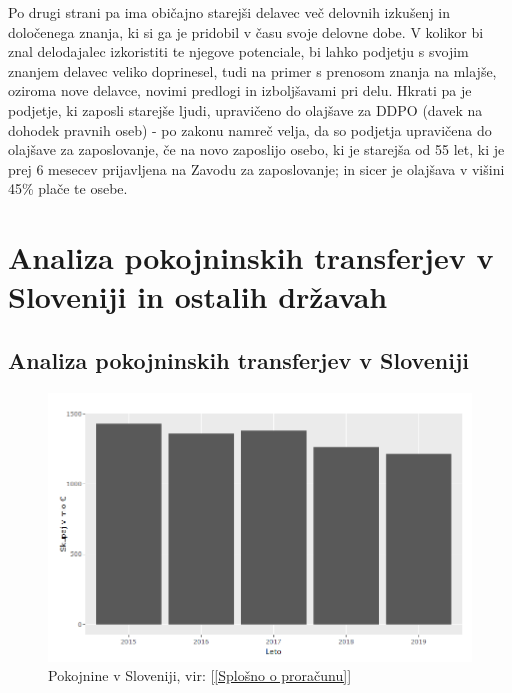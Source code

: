 \documentclass[12pt, a4paper]{article}
\begin{document}
\hspace*{5mm} Po drugi strani pa ima običajno starejši delavec več delovnih izkušenj in določenega znanja, ki si ga je pridobil v času svoje delovne dobe. V kolikor bi znal delodajalec izkoristiti te njegove potenciale, bi lahko podjetju s svojim znanjem delavec veliko doprinesel, tudi na primer s prenosom znanja na mlajše, oziroma nove delavce, novimi predlogi in izboljšavami pri delu. Hkrati pa je podjetje, ki zaposli starejše ljudi, upravičeno do olajšave za DDPO (davek na dohodek pravnih oseb) - po zakonu namreč velja, da so podjetja upravičena do olajšave za zaposlovanje, če na novo zaposlijo osebo, ki je starejša od 55 let, ki je prej 6 mesecev prijavljena na Zavodu za zaposlovanje; in sicer je olajšava v višini 45\% plače te osebe. 

\newpage
\section[Analiza pokojninskih transferjev v Sloveniji in ostalih državah]{Analiza pokojninskih transferjev v Sloveniji in ostalih državah}
\subsection{Analiza pokojninskih transferjev v Sloveniji}

\begin{figure}[h!]
\centering
\includegraphics[width = 13 cm]{pokojnine_slovenija.png}
\caption{Pokojnine v Sloveniji, vir: [\ref{Splošno o proračunu}]}
\label{Slika 4}
\end{figure}
\end{document}

